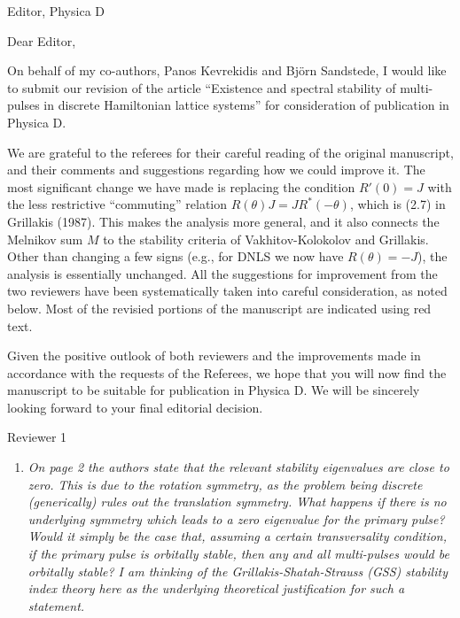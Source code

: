 \documentclass[11pt]{letter}
\begin{document}
\address{Ross Parker \\
Division of Applied Mathematics \\
Brown University \\
Providence, RI 02912 \\
\texttt{ross\_parker@brown.edu}}%
\signature{Ross Parker}
\begin{letter}{Editor, Physica D}

\opening{Dear Editor,}

On behalf of my co-authors, Panos Kevrekidis and Bj\"orn Sandstede, I would like to submit our revision of the article ``Existence and spectral stability of multi-pulses in discrete Hamiltonian lattice systems'' for consideration of publication in Physica D. 

We are grateful to the referees for their careful reading of the original manuscript, and their comments and suggestions regarding how we could improve it. The most significant change we have made is replacing the condition $R'(0) = J$ with the less restrictive ``commuting'' relation $R(\theta)J = J R^*(-\theta)$, which is (2.7) in Grillakis (1987). This makes the analysis more general, and it also connects the Melnikov sum $M$ to the stability criteria of Vakhitov-Kolokolov and Grillakis. Other than changing a few signs (e.g., for DNLS we now have $R(\theta) = -J$), the analysis is essentially unchanged. All the suggestions for improvement from the two reviewers have been systematically taken into
careful consideration, as noted below. Most of the revisied portions of the manuscript are indicated using red text.

Given the positive outlook of both reviewers and the
improvements made in accordance with the requests of the
Referees, we hope that you will now find the manuscript 
to be suitable for publication in Physica D. We will
be sincerely looking forward to your final editorial decision.

Reviewer 1
\begin{enumerate}
\item \emph{On page 2 the authors state that the relevant stability eigenvalues are close to zero. This is due to the rotation symmetry, as the problem being discrete (generically) rules out the translation symmetry. What happens if there is no underlying symmetry which leads to a zero eigenvalue for the primary pulse? Would it simply be the case that, assuming a certain transversality condition, if the primary pulse is orbitally stable, then any and all multi-pulses would be orbitally stable? I am thinking of the Grillakis-Shatah-Strauss (GSS) stability index theory here as the underlying theoretical justification for such a statement.}


\end{enumerate}
\end{letter}
\end{document}
